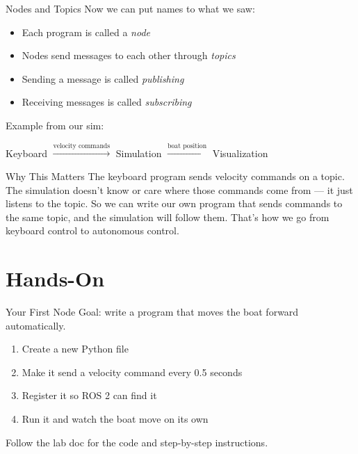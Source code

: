 \documentclass[aspectratio=169]{beamer}
\begin{document}
\begin{frame}{Nodes and Topics}
    Now we can put names to what we saw:
    \vfill
    \begin{itemize}
        \item Each program is called a \textit{node}
        \item Nodes send messages to each other through \textit{topics}
        \item Sending a message is called \textit{publishing}
        \item Receiving messages is called \textit{subscribing}
    \end{itemize}
    \vfill
    Example from our sim:
    \begin{center}
        Keyboard $\xrightarrow{\text{velocity commands}}$ Simulation $\xrightarrow{\text{boat position}}$ Visualization
    \end{center}
\end{frame}

\begin{frame}{Why This Matters}
    The keyboard program sends velocity commands on a topic.
    \vfill
    The simulation doesn't know or care where those commands come from --- it just listens to the topic.
    \vfill
    So we can write our own program that sends commands to the same topic, and the simulation will follow them.
    \vfill
    That's how we go from keyboard control to autonomous control.
\end{frame}

\section{Hands-On}

\begin{frame}{Your First Node}
    Goal: write a program that moves the boat forward automatically.
    \vfill
    \begin{enumerate}
        \item Create a new Python file
        \item Make it send a velocity command every 0.5 seconds
        \item Register it so ROS 2 can find it
        \item Run it and watch the boat move on its own
    \end{enumerate}
    \vfill
    Follow the lab doc for the code and step-by-step instructions.
\end{frame}
\end{document}
